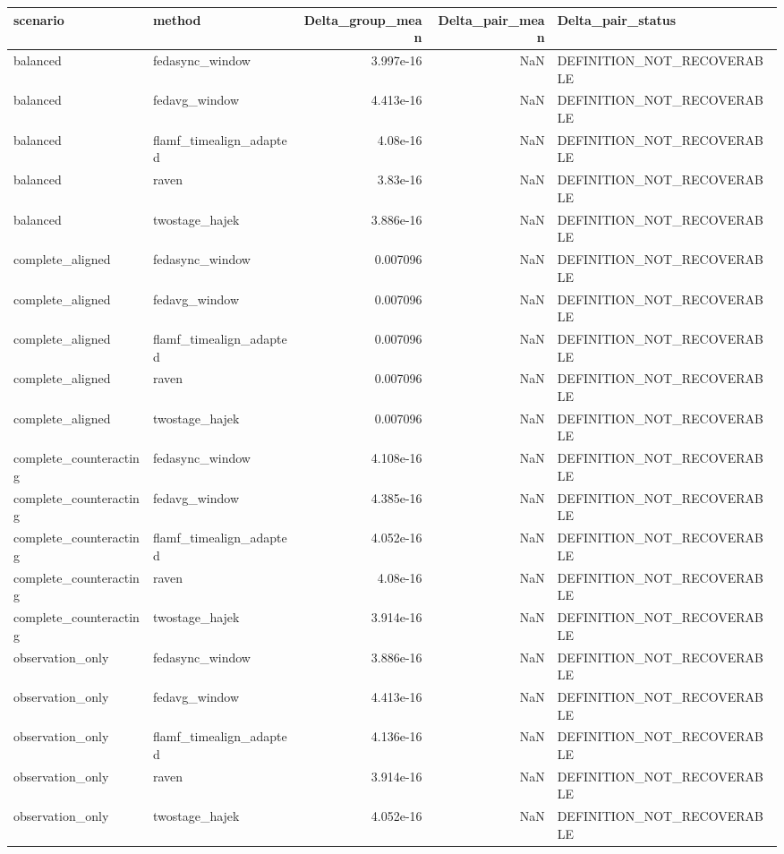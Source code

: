 \begin{tabular}{llrrl}
\toprule
scenario & method & Delta_group_mean & Delta_pair_mean & Delta_pair_status \\
\midrule
balanced & fedasync_window & 3.997e-16 & NaN & DEFINITION_NOT_RECOVERABLE \\
balanced & fedavg_window & 4.413e-16 & NaN & DEFINITION_NOT_RECOVERABLE \\
balanced & flamf_timealign_adapted & 4.08e-16 & NaN & DEFINITION_NOT_RECOVERABLE \\
balanced & raven & 3.83e-16 & NaN & DEFINITION_NOT_RECOVERABLE \\
balanced & twostage_hajek & 3.886e-16 & NaN & DEFINITION_NOT_RECOVERABLE \\
complete_aligned & fedasync_window & 0.007096 & NaN & DEFINITION_NOT_RECOVERABLE \\
complete_aligned & fedavg_window & 0.007096 & NaN & DEFINITION_NOT_RECOVERABLE \\
complete_aligned & flamf_timealign_adapted & 0.007096 & NaN & DEFINITION_NOT_RECOVERABLE \\
complete_aligned & raven & 0.007096 & NaN & DEFINITION_NOT_RECOVERABLE \\
complete_aligned & twostage_hajek & 0.007096 & NaN & DEFINITION_NOT_RECOVERABLE \\
complete_counteracting & fedasync_window & 4.108e-16 & NaN & DEFINITION_NOT_RECOVERABLE \\
complete_counteracting & fedavg_window & 4.385e-16 & NaN & DEFINITION_NOT_RECOVERABLE \\
complete_counteracting & flamf_timealign_adapted & 4.052e-16 & NaN & DEFINITION_NOT_RECOVERABLE \\
complete_counteracting & raven & 4.08e-16 & NaN & DEFINITION_NOT_RECOVERABLE \\
complete_counteracting & twostage_hajek & 3.914e-16 & NaN & DEFINITION_NOT_RECOVERABLE \\
observation_only & fedasync_window & 3.886e-16 & NaN & DEFINITION_NOT_RECOVERABLE \\
observation_only & fedavg_window & 4.413e-16 & NaN & DEFINITION_NOT_RECOVERABLE \\
observation_only & flamf_timealign_adapted & 4.136e-16 & NaN & DEFINITION_NOT_RECOVERABLE \\
observation_only & raven & 3.914e-16 & NaN & DEFINITION_NOT_RECOVERABLE \\
observation_only & twostage_hajek & 4.052e-16 & NaN & DEFINITION_NOT_RECOVERABLE \\

\end{tabular}
